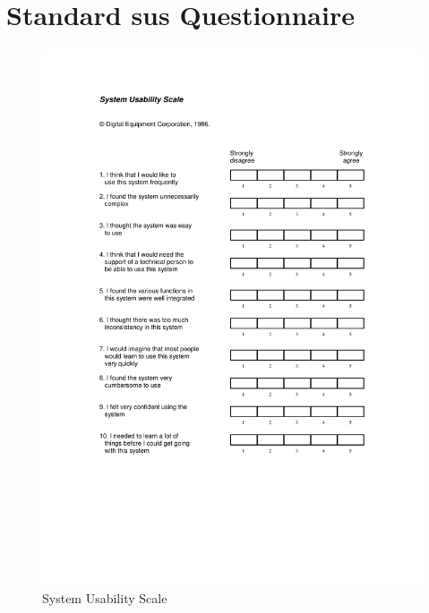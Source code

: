 \section{Standard \acrlong{sus} Questionnaire}
\label{app:standard_sus_questionnaire}


\begin{figure}
    \centering
    \includegraphics[width=1\linewidth]{appendices/System Usability Scale.pdf}
    \caption{System Usability Scale }
    \label{fig:standard_sus_questionnaire}
\end{figure}